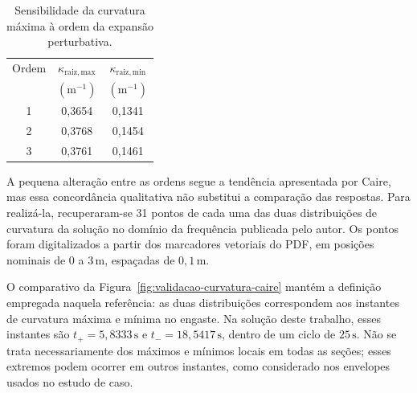 \documentclass[arial,centeredequations,english,brazilian,oneside,section=TITLE]{ifes8}
\begin{document}
\begin{table}[htb]
  \caption{Sensibilidade da curvatura máxima à ordem da expansão perturbativa.}
  \label{tab:ordem-perturbativa}
  \centering
  \begin{tabular}{ccc}
    \hline
    Ordem & $\kappa_{\mathrm{raiz,max}}$ &
      $\kappa_{\mathrm{raiz,min}}$\\
    & $(\mathrm{m^{-1}})$ & $(\mathrm{m^{-1}})$\\
    \hline
    1 & 0,3654 & 0,1341\\
    2 & 0,3768 & 0,1454\\
    3 & 0,3761 & 0,1461\\
    \hline
  \end{tabular}
\end{table}

A pequena alteração entre as ordens segue a tendência apresentada por
Caire, mas essa concordância qualitativa não substitui a comparação das
respostas. Para realizá-la, recuperaram-se 31 pontos de cada uma das duas
distribuições de curvatura da solução no domínio da frequência
publicada pelo autor. Os pontos foram digitalizados a
partir dos marcadores vetoriais do PDF, em posições nominais de
$0$ a $3\,\mathrm{m}$, espaçadas de $0{,}1\,\mathrm{m}$.

O comparativo da Figura~\ref{fig:validacao-curvatura-caire} mantém a
definição empregada naquela referência: as duas distribuições
correspondem aos instantes de curvatura máxima e mínima no engaste.
Na solução deste trabalho, esses instantes são
$t_+=5{,}8333\,\mathrm{s}$ e $t_-=18{,}5417\,\mathrm{s}$, dentro de um
ciclo de $25\,\mathrm{s}$. Não se trata necessariamente dos máximos e
mínimos locais em todas as seções; esses extremos podem ocorrer em
outros instantes, como considerado nos envelopes usados no estudo de caso.
\end{document}
